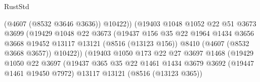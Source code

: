 \begin{lexlean}{RustStd}
\begin{coremodule}
                                          (@4607 (@8532 @3646 @3636))
                                          @10422))
                                      (@19403
                                        @1048
                                        @1052
                                        @22
                                        @51
                                        @3673
                                        @3699
                                        (@19429
                                          @1048
                                          @22
                                          @3673
                                          (@19437
                                            @156
                                            @35
                                            @22
                                            @1964
                                            @1434
                                            @3656
                                            @3668
                                            @19452
                                            @13117
                                            @13121
                                            (@8516 (@13123 @156))
                                            @8410
                                            (@4607 (@8532 @3668 @3657))
                                            @10422))
                                        (@19403
                                          @1050
                                          @173
                                          @22
                                          @27
                                          @3697
                                          @1468
                                          (@19429
                                            @1050
                                            @22
                                            @3697
                                            (@19437
                                              @365
                                              @35
                                              @22
                                              @1461
                                              @1434
                                              @3679
                                              @3692
                                              (@19447 @1461 @19450 @7972)
                                              @13117
                                              @13121
                                              (@8516 (@13123 @365))

\end{coremodule}
\end{lexlean}
